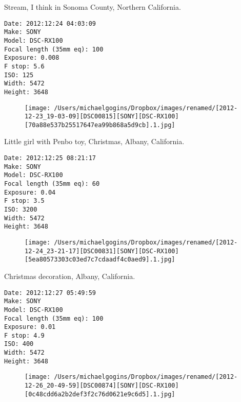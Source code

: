 \documentclass[11pt,letter,DIV=14,paper=landscape]{scrbook}
\begin{document}
\clearpage
\noindent Stream, I think in Sonoma County, Northern California.
\noindent
\begin{lstlisting}
Date: 2012:12:24 04:03:09
Make: SONY
Model: DSC-RX100
Focal length (35mm eq): 100
Exposure: 0.008
F stop: 5.6
ISO: 125
Width: 5472
Height: 3648
\end{lstlisting}
\clearpage

\begin{figure}
\texttt{[image: /Users/michaelgogins/Dropbox/images/renamed/[2012-12-23\_19-03-09][DSC00815][SONY][DSC-RX100][70a88e537b25517647ea99b868a5d9cb].1.jpg]}
\end{figure}
    
\clearpage
\noindent Little girl with Penbo toy, Christmas, Albany, California.
\noindent
\begin{lstlisting}
Date: 2012:12:25 08:21:17
Make: SONY
Model: DSC-RX100
Focal length (35mm eq): 60
Exposure: 0.04
F stop: 3.5
ISO: 3200
Width: 5472
Height: 3648
\end{lstlisting}
\clearpage

\begin{figure}
\texttt{[image: /Users/michaelgogins/Dropbox/images/renamed/[2012-12-24\_23-21-17][DSC00831][SONY][DSC-RX100][5ea80573303c03ed7c7cdaadf4c0aed9].1.jpg]}
\end{figure}
    
\clearpage
\noindent Christmas decoration, Albany, California.
\noindent
\begin{lstlisting}
Date: 2012:12:27 05:49:59
Make: SONY
Model: DSC-RX100
Focal length (35mm eq): 100
Exposure: 0.01
F stop: 4.9
ISO: 400
Width: 5472
Height: 3648
\end{lstlisting}
\clearpage

\begin{figure}
\texttt{[image: /Users/michaelgogins/Dropbox/images/renamed/[2012-12-26\_20-49-59][DSC00874][SONY][DSC-RX100][0c48cdd6a2b2def3f2c76d0621e9c6d5].1.jpg]}
\end{figure}
    
\end{document}
